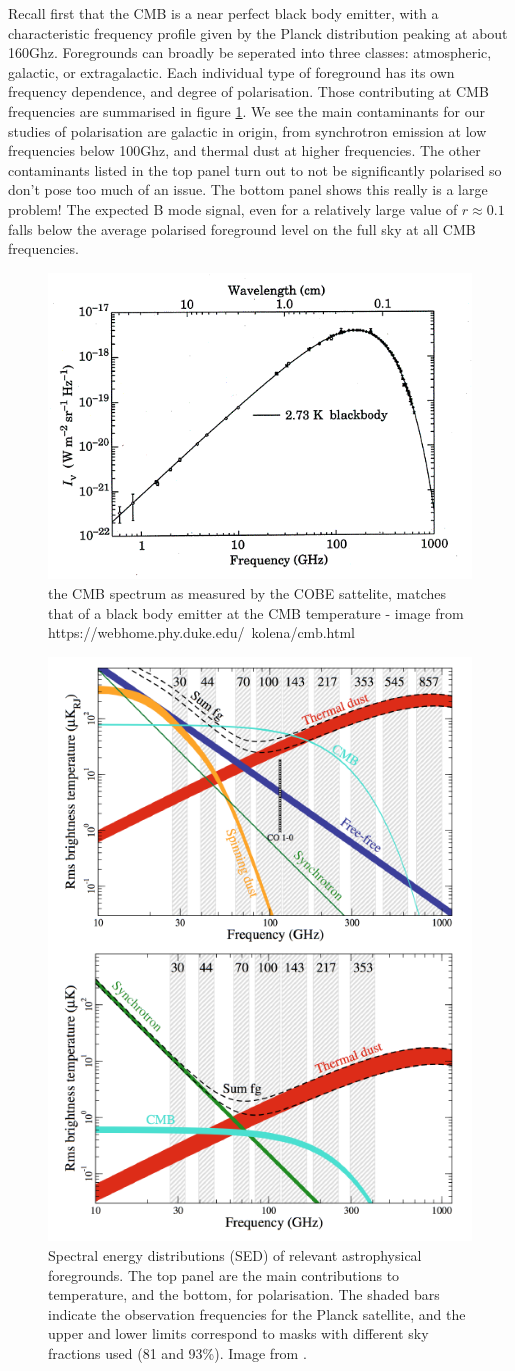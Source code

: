\documentclass[a4paper,10pt]{article}
\begin{document}
Recall first that the CMB is a near perfect black body emitter, with a characteristic frequency profile given by the Planck distribution peaking at about 160Ghz. Foregrounds can broadly be seperated into three classes: atmospheric, galactic, or extragalactic. Each individual type of foreground has its own frequency dependence, and degree of polarisation. Those contributing at CMB frequencies are summarised in figure \ref{foregrounds}. We see the main contaminants for our studies of polarisation are galactic in origin, from synchrotron emission at low frequencies below 100Ghz, and thermal dust at higher frequencies. The other contaminants listed in the top panel turn out to not be significantly polarised so don't pose too much of an issue. The bottom panel shows this really is a large problem! The expected B mode signal, even for a relatively large value of $r\approx0.1$ falls below the average polarised foreground level on the full sky at all CMB frequencies.\\

\begin{figure}[h]
  \includegraphics[width=0.4\linewidth]{cmbspectrum1.png}
  \centering
  \caption{the CMB spectrum as measured by the COBE sattelite, matches that of a black body emitter at the CMB temperature - image from https://webhome.phy.duke.edu/~kolena/cmb.html  }
\end{figure}

\begin{figure}[h]
\includegraphics[width=0.4\linewidth]{foregrounds.png}
\centering
\caption{Spectral energy distributions (SED) of relevant astrophysical foregrounds. The top panel are the main contributions to temperature, and the bottom, for polarisation. The shaded bars indicate the observation frequencies for the Planck satellite, and the upper and lower limits correspond to masks with different sky fractions used (81 and 93\%). Image from \cite{planck2016b}.}
\label{foregrounds}
\end{figure}
\end{document}
